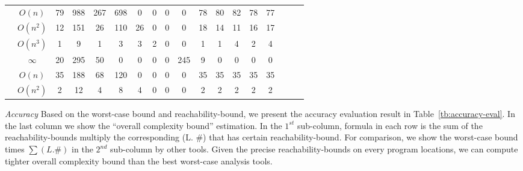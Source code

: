 \begin{table}[ht]
{\begin{tabular}{ | >{\scriptsize}c | >{\scriptsize}c | >{\scriptsize}c | >{\scriptsize}c | >{\scriptsize}c | c | c | c | c | c | c | c | c | c | c | c | c | c |}
    \cline{2-2}
    & $O(n)$ & 79 & 988 & 267 & 698 & 0 & 0 & 0 & 0 & 78 & 80 & 82 & 78 & 77  \\
    \cline{2-2}
    & $O(n^2)$ & 12 & 151 & 26 & 110 & 26 & 0 & 0 & 0 & 18 & 14 & 11 & 16 & 17  \\
    \cline{2-2}
    & $O(n^3)$ & 1 &  9 & 1 & 3 & 3 & 2 & 0 & 0 & 1 & 1 & 4 & 2 & 4  \\
    \cline{2-2}
    & $\infty$ & 20 & 295 &  50 & 0 & 0 & 0 & 0 & 245 & 9 & 0 & 0 & 0 & 0  \\
    \hline \hline
    \multirow{2}{*}{Tianhan} 
    & $O(n)$ & 35 & 188 & 68 & 120 & 0 & 0 & 0 & 0 & 35 & 35 & 35 & 35 & 35  \\
    \cline{2-2}
    & $O(n^2)$ & 2 & 12 & 4 & 8 & 4 & 0 & 0 & 0 & 2 & 2 & 2 & 2 & 2   \\
    \hline
    \hline
    \end{tabular}
    }
    \end{table}

\emph{Accuracy}
Based on the worst-case bound and reachability-bound, we present the accuracy evaluation result in
Table~\ref{tb:accuracy-eval}.
In the last column we show the ``overall complexity bound'' estimation.
In the $1^{st}$ sub-column, formula in each row is the sum of the reachability-bounds multiply the corresponding (L. \#) that has certain reachability-bound.
For comparison, we show the worst-case bound times $\sum(L. \#)$ in the $2^{nd}$ sub-column by other tools. Given the precise reachability-bounds on every program locations, we can compute tighter overall complexity bound than the best worst-case analysis tools.

